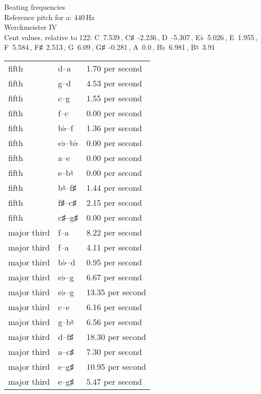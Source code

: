 \documentclass{standalone}
\def\str{\textquotesingle}
\def\cn{\textcent}
\begin{document}
\begin{minipage}{8cm}
\begin{center}
  {\Large Beating frequencies}\\[2ex]
  Reference pitch for a\str: 440\,Hz\\[1ex]
  Werckmeister IV\\[1ex]
  Cent values, relative to 122: C~7.539\,\cn, C♯~-2.236\,\cn, D~-5.307\,\cn, E♭~5.026\,\cn, E~1.955\,\cn, F~5.584\,\cn, F♯~2.513\,\cn, G~6.09\,\cn, G♯~-0.281\,\cn, A~0.0\,\cn, B♭~6.981\,\cn, B♮~3.91\,\cn
\end{center}
\begin{longtable}{p{2cm}p{1cm}p{3cm}}
  \toprule
  fifth & d\str--a\str & 1.70 per second \\fifth & g--d\str & 4.53 per second \\fifth & c\str--g\str & 1.55 per second \\fifth & f--c\str & 0.00 per second \\fifth & b♭--f\str & 1.36 per second \\fifth & e♭--b♭ & 0.00 per second \\fifth & a--e\str & 0.00 per second \\fifth & e--b♮ & 0.00 per second \\fifth & b♮--f♯\str & 1.44 per second \\fifth & f♯--c♯\str & 2.15 per second \\fifth & c♯\str--g♯\str & 0.00 per second \\major third & f\str--a\str & 8.22 per second \\major third & f--a & 4.11 per second \\major third & b♭--d\str & 0.95 per second \\major third & e♭--g & 6.67 per second \\major third & e♭\str--g\str & 13.35 per second \\major third & c\str--e\str & 6.16 per second \\major third & g--b♮ & 6.56 per second \\major third & d\str--f♯\str & 18.30 per second \\major third & a--c♯\str & 7.30 per second \\major third & e\str--g♯\str & 10.95 per second \\major third & e--g♯ & 5.47 per second \\
  \bottomrule
\end{longtable}
\end{minipage}
\end{document}
